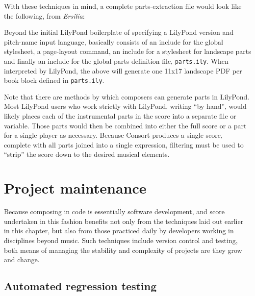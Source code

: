 With these techniques in mind, a complete parts-extraction file would
look like the following, from \emph{Ersilia}:


\noindent Beyond the initial LilyPond boilerplate of specifying a LilyPond
version and pitch-name input language, basically consists of an include for the
global stylesheet, a page-layout command, an include for a stylesheet for
landscape parts and finally an include for the global parts definition file,
\texttt{parts.ily}. When interpreted by LilyPond, the above will generate one
11x17 landscape PDF per book block defined in \texttt{parts.ily}.

Note that there are methods by which composers can generate parts in
LilyPond. Most LilyPond users who work strictly with LilyPond, writing
\enquote{by hand}, would likely places each of the instrumental parts in the
score into a separate file or variable. Those parts would then be combined into
either the full score or a part for a single player as necessary. Because
Consort produces a single score, complete with all parts joined into a single
expression, filtering must be used to \enquote{strip} the score down to the
desired musical elements.

\section{Project maintenance}
\label{sec:project-maintenance}

Because composing in code is essentially software development, and score
undertaken in this fashion benefits not only from the techniques laid out
earlier in this chapter, but also from those practiced daily by developers
working in disciplines beyond music. Such techniques include version control
and testing, both means of managing the stability and complexity of projects
are they grow and change.

\subsection{Automated regression testing}
\label{ssec:testing}


